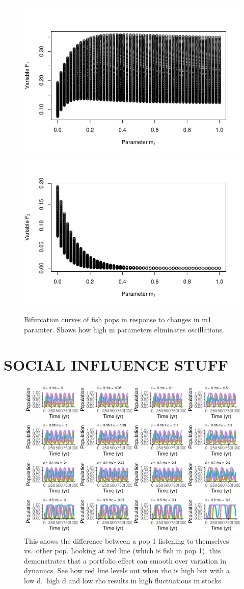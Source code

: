 \documentclass[
]{article}
\begin{document}
\begin{figure}
\includegraphics[width=0.5\linewidth]{SubmissionFigs_files/figure-latex/mBifCurve-1} \includegraphics[width=0.5\linewidth]{SubmissionFigs_files/figure-latex/mBifCurve-2} \caption{Bifurcation curves of fish pops in response to changes in m1 paramter. Shows how high m parameters eliminates oscillations.}\label{fig:mBifCurve}
\end{figure}

\hypertarget{social-influence-stuff}{%
\section{SOCIAL INFLUENCE STUFF}\label{social-influence-stuff}}



\begin{figure}
\centering
\includegraphics{SubmissionFigs_files/figure-latex/influenceAsym-1.pdf}
\caption{\label{fig:influenceAsym}This shows the difference between a pop 1 listening to themselves vs.~other pop. Looking at red line (which is fish in pop 1), this demonstrates that a portfolio effect can smooth over variation in dynamics. See how red line levels out when rho is high but with a low d.~high d and low rho results in high fluctuations in stocks \label{influenceAsym}}
\end{figure}
\end{document}
